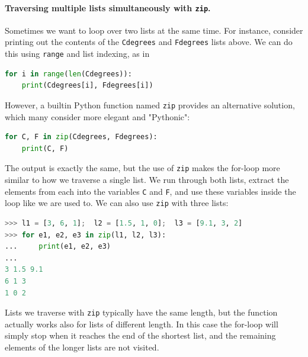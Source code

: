 \documentclass[graybox,envcountchap,sectrefs,final]{svmonodo}
\begin{document}
\paragraph{Traversing multiple lists simultaneously with \texttt{zip}.}
Sometimes we want to loop over two lists at the same time. For instance, consider printing out the contents of the \texttt{Cdegrees} and
\texttt{Fdegrees} lists above. We can do this using \texttt{range} and list indexing, as in
\begin{lstlisting}[language=Python,style=blue1]
for i in range(len(Cdegrees)):
    print(Cdegrees[i], Fdegrees[i])
\end{lstlisting}
However, a builtin Python function named \texttt{zip} provides an alternative solution, which many consider more elegant and
"Pythonic":
\begin{lstlisting}[language=Python,style=blue1]
for C, F in zip(Cdegrees, Fdegrees):
    print(C, F)
\end{lstlisting}
The output is exactly the same, but the use of \texttt{zip} makes the for-loop more similar to how we traverse a single list. We run through both
lists, extract the elements from each into the variables \texttt{C} and \texttt{F}, and use these variables inside the loop like we are used to.
We can also use \texttt{zip} with three lists:
\begin{lstlisting}[language=Python,style=blue1]
>>> l1 = [3, 6, 1];  l2 = [1.5, 1, 0];  l3 = [9.1, 3, 2]
>>> for e1, e2, e3 in zip(l1, l2, l3):
...     print(e1, e2, e3)
...
3 1.5 9.1
6 1 3
1 0 2
\end{lstlisting}
Lists we traverse with \texttt{zip} typically have the same length, but the function actually works also for lists of different length.
In this case the for-loop will simply stop when it reaches the end of the shortest list, and the remaining elements of the longer
lists are not visited.
\end{document}
